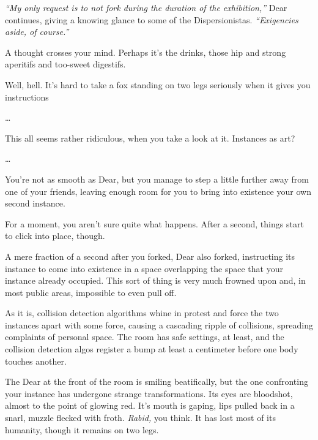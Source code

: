 \emph{``My only request is to not fork during the duration of the exhibition,''} Dear continues, giving a knowing glance to some of the Dispersionistas. \emph{``Exigencies aside, of course.''}

A thought crosses your mind. Perhaps it's the drinks, those hip and strong aperitifs and too-sweet digestifs.

\vfill

\newpage

\null
\vfill

Well, hell. It's hard to take a fox standing on two legs seriously when it gives you instructions

\vfill

\newpage
\null
\vfill

\ldots{}
\null
\vfill

\newpage
\null
\vfill

This all seems rather ridiculous, when you take a look at it. Instances as art?
\null
\vfill

\newpage
\null
\vfill

\ldots{}
\null
\vfill

\newpage
\null
\vfill

You're not as smooth as Dear, but you manage to step a little further away from one of your friends, leaving enough room for you to bring into existence your own second instance.
\null
\vfill

\newpage
For a moment, you aren't sure quite what happens. After a second, things start to click into place, though.

A mere fraction of a second after you forked, Dear also forked, instructing its instance to come into existence in a space overlapping the space that your instance already occupied. This sort of thing is very much frowned upon and, in most public areas, impossible to even pull off.

As it is, collision detection algorithms whine in protest and force the two instances apart with some force, causing a cascading ripple of collisions, spreading complaints of personal space. The room has safe settings, at least, and the collision detection algos register a bump at least a centimeter before one body touches another.

The Dear at the front of the room is smiling beatifically, but the one confronting your instance has undergone strange transformations. Its eyes are bloodshot, almost to the point of glowing red. It's mouth is gaping, lips pulled back in a snarl, muzzle flecked with froth. \emph{Rabid,} you think. It has lost most of its humanity, though it remains on two legs.

